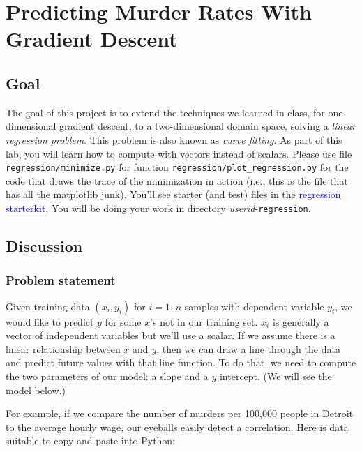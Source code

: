 \documentclass[titlepage]{tufte-book}
\newcounter{problem}
\begin{document}
\chapter{Predicting Murder Rates With Gradient Descent}

\section{Goal}

\begin{fullwidth}

The goal of this project is to extend the techniques we learned in class, for one-dimensional gradient descent, to a two-dimensional domain space, solving a {\em linear regression problem}.  This problem is also known as {\em curve fitting}.  As part of this lab, you will learn how to compute with vectors instead of scalars. Please use file {\tt regression/minimize.py} for function {\tt regression/plot\_regression.py} for the code that draws the trace of the minimization in action (i.e., this is the file that has all the matplotlib junk).  You'll see starter (and test) files in the \href{https://github.com/parrt/msan501-starterkit/tree/master/regression}{\textcolor{blue}{regression starterkit}}. You will be doing your work in directory {\em userid}-{\tt regression}.

\section{Discussion}

\subsection{Problem statement}

Given training data $(x_i, y_i)$ for $i=1..n$ samples with dependent variable $y_i$, we would like to predict $y$ for some $x$'s not in our training set. $x_i$ is generally a vector of independent variables but we'll use a scalar. If we assume there is a linear relationship between $x$ and $y$, then we can draw a line through the data and predict future values with that line function. To do that, we need to compute the two parameters of our model: a slope and a $y$ intercept. (We will see the model below.)

For example, if we compare the number of murders per 100,000 people in Detroit to the average hourly wage, our eyeballs easily detect a correlation.  Here is data suitable to copy and paste into Python:


\end{fullwidth}
\end{document}
